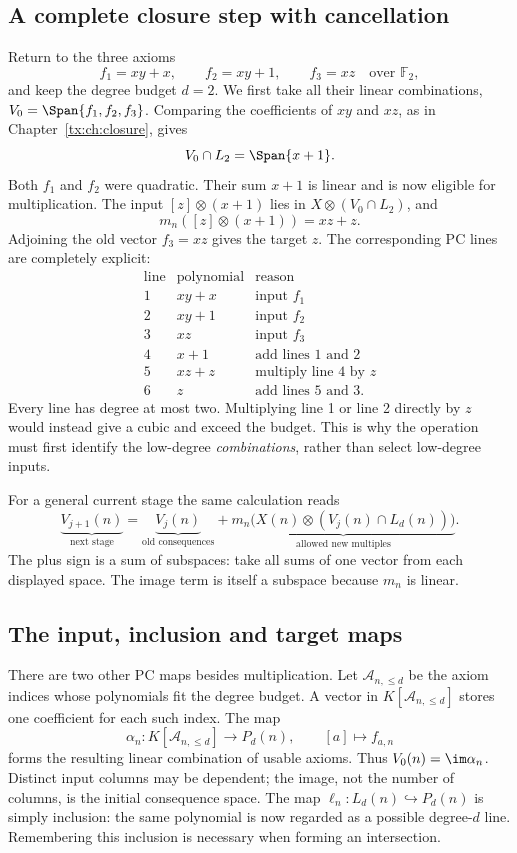 \documentclass[11pt,a4paper,oneside,openany]{book}
\theoremstyle{definition}\newtheorem{definition}[theorem]{Definition}
\theoremstyle{remark}\newtheorem{remark}[theorem]{Remark}
\numberwithin{equation}{chapter}
\begin{document}
\subsection{A complete closure step with cancellation}
Return to the three axioms
\[
 f_1=xy+x,\qquad f_2=xy+1,\qquad f_3=xz
                         \quad\text{over }\mathbb F_2,
\]
and keep the degree budget $d=2$. We first take all their linear
combinations, $V_0=\Span\{f_1,f_2,f_3\}$. Comparing the coefficients
of $xy$ and $xz$, as in Chapter~\ref{tx:ch:closure}, gives
\[
                         V_0\cap L_2=\Span\{x+1\}.
\]
Both $f_1$ and $f_2$ were quadratic. Their sum $x+1$ is linear
and is now eligible for multiplication.
The input $[z]\otimes(x+1)$ lies in
$X\otimes(V_0\cap L_2)$, and
\[
                 m_n([z]\otimes(x+1))=xz+z.
\]
Adjoining the old vector $f_3=xz$ gives the target $z$.
The corresponding PC lines are completely explicit:
\[
 \begin{array}{c|l|l}
 \text{line}&\text{polynomial}&\text{reason}\\ \hline
 1&xy+x&\text{input }f_1\\
 2&xy+1&\text{input }f_2\\
 3&xz&\text{input }f_3\\
 4&x+1&\text{add lines 1 and 2}\\
 5&xz+z&\text{multiply line 4 by }z\\
 6&z&\text{add lines 5 and 3}.
 \end{array}
\]
Every line has degree at most two. Multiplying line 1 or line 2
directly by $z$ would instead give a cubic and exceed the budget.
This is why the operation must first identify the low-degree
\emph{combinations}, rather than select low-degree inputs.

For a general current stage the same calculation reads
\[
 \underbrace{V_{j+1}(n)}_{\text{next stage}}
 =\underbrace{V_j(n)}_{\text{old consequences}}
  +\underbrace{m_n\bigl(X(n)\otimes
                   (V_j(n)\cap L_d(n))\bigr)}_{\text{allowed new multiples}}.
\]
The plus sign is a sum of subspaces: take all sums of one vector
from each displayed space. The image term is itself a subspace
because $m_n$ is linear.

\subsection{The input, inclusion and target maps}
There are two other PC maps besides multiplication.
Let $\mathcal A_{n,\le d}$ be the axiom indices whose polynomials
fit the degree budget. A vector in $K[\mathcal A_{n,\le d}]$
stores one coefficient for each such index. The map
\[
        \alpha_n:K[\mathcal A_{n,\le d}]\to P_d(n),
                  \qquad [a]\mapsto f_{a,n}
\]
forms the resulting linear combination of usable axioms.
Thus $V_0(n)=\im\alpha_n$. Distinct input columns may be dependent;
the image, not the number of columns, is the initial consequence space.
The map
$\ell_n:L_d(n)\hookrightarrow P_d(n)$ is simply inclusion:
the same polynomial is now regarded as a possible degree-$d$ line.
Remembering this inclusion is necessary when forming an intersection.
\end{document}
